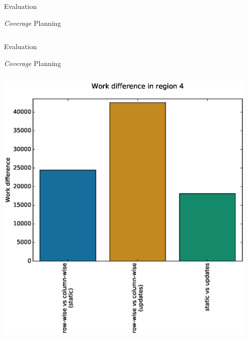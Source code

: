 \documentclass[9pt]{beamer}
\begin{document}
\begin{frame}{Evaluation}
\begin{block}{\textit{Coverage} Planning}
\begin{columns}
\begin{column}{0.5\textwidth}
\begin{center}
                \end{center}
            \end{column}
        \end{columns}
    \end{block}
\end{frame}

\begin{frame}{Evaluation}
    \begin{block}{\textit{Coverage} Planning}
        \begin{columns}
            \begin{column}{0.5\textwidth}
                \begin{center}
                    \includegraphics[width=\textwidth,trim={0cm 0cm 0cm 0cm},clip]{img/diff_r4.eps}
                \end{center}
            \end{column}
            \begin{column}{0.5\textwidth}
                \begin{center}

\end{center}
\end{column}
\end{columns}
\end{block}
\end{frame}
\end{document}
